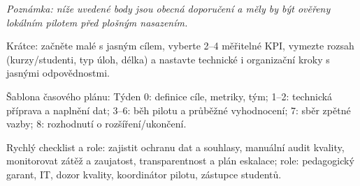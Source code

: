 \noindent\textit{Poznámka: níže uvedené body jsou obecná doporučení a měly by být ověřeny lokálním pilotem před plošným nasazením.}

Krátce: začněte malé s jasným cílem, vyberte 2–4 měřitelné KPI, vymezte rozsah (kurzy/studenti, typ úloh, délka) a nastavte technické i organizační kroky s jasnými odpovědnostmi.

Šablona časového plánu: Týden 0: definice cíle, metriky, tým; 1--2: technická příprava a naplnění dat; 3--6: běh pilotu a průběžné vyhodnocení; 7: sběr zpětné vazby; 8: rozhodnutí o rozšíření/ukončení.

Rychlý checklist a role: zajistit ochranu dat a souhlasy, manuální audit kvality, monitorovat zátěž a zaujatost, transparentnost a plán eskalace; role: pedagogický garant, IT, dozor kvality, koordinátor pilotu, zástupce studentů.